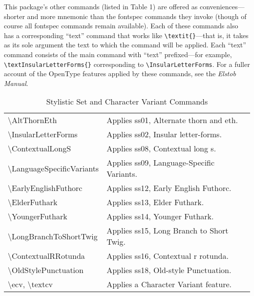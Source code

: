 \documentclass[12pt]{article}
\newcommand{\fspec}{{\sffamily fontspec}}
\newcommand{\bluerow}{\rowcolor{myLightBlue}}
\begin{document}
This package's other commands (listed in Table 1) are offered as conveniences---shorter and more
mnemonic than the {\fspec} commands they invoke (though of course all {\fspec} commands
remain available). Each of these commands
also has a corresponding “text” command that works like 
{\verb|\textit{}|}—that is, it takes
as its sole argument the text to which the command will be applied. Each “text” command
consists of the main command with “text” prefixed—for example,
{\color{BrickRed}\verb|\textInsularLetterForms{}|}
corresponding to {\color{BrickRed}\verb|\InsularLetterForms|}.\linebreak
For a fuller account of the OpenType features
applied by these commands, see the \textit{Elstob Manual}.

\begin{table}[ht]
    \centering
    \begin{tabular}{| l | p{2.75in} |}
        \hline
    \bluerow\textbackslash AltThornEth & Applies ss01, Alternate thorn and eth.\\
    \textbackslash InsularLetterForms & Applies ss02, Insular letter-forms.\\
    \bluerow\textbackslash ContextualLongS & Applies ss08, Contextual long s.\\
    \textbackslash LanguageSpecificVariants & \small Applies ss09, Language-Specific Variants.\\
    \bluerow\textbackslash EarlyEnglishFuthorc & Applies ss12, Early English Futhorc.\\
    \textbackslash ElderFuthark & Applies ss13, Elder Futhark.\\
    \bluerow\textbackslash YoungerFuthark & Applies ss14, Younger Futhark.\\
    \textbackslash LongBranchToShortTwig & Applies ss15, Long Branch to Short Twig.\\
    \bluerow\textbackslash ContextualRRotunda & Applies ss16, Contextual r rotunda.\\
    \textbackslash OldStylePunctuation & Applies ss18, Old-style Punctuation.\\
    \bluerow\textbackslash ecv, \textbackslash textcv & Applies a Character Variant feature.\\
    \hline
    \end{tabular}
\caption{Stylistic Set and Character Variant Commands}
\end{table}
\end{document}
